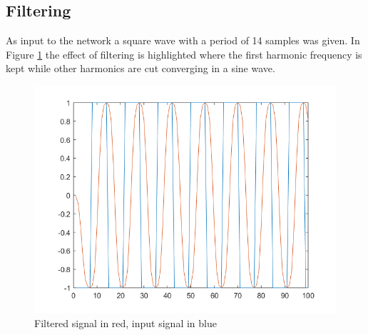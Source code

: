 \subsection{Filtering}
As input to the network a square wave with a period of 14 samples was given. In Figure \ref{fig:filt} the effect of filtering is highlighted where the first harmonic frequency is kept while other harmonics are cut converging in a sine wave.
\begin{figure}[H]
  \centering
  \includegraphics[width=0.9\linewidth]{./images/filtered}
  \caption{Filtered signal in red, input signal in blue}
  \label{fig:filt}
\end{figure}